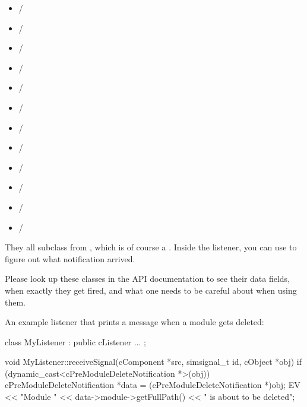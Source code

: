 \begin{itemize}
  \item {} / 
  \item {} / 
  \item {} / 
  \item {} / 
  \item {} / 
  \item {} / 
  \item {} / 
  \item {} / 
  \item {} / 
  \item {} / 
  \item {} / 
  \item {} / 
\end{itemize}

They all subclass from , which is of course a
. Inside the listener, you can use  to figure
out what notification arrived.

\begin{note}
  Please look up these classes in the API documentation to see their data fields,
  when exactly they get fired, and what one needs to be careful about when using them.
\end{note}

An example listener that prints a message when a module gets deleted:

\begin{cpp}
class MyListener : public cListener
{
   ...
};

void MyListener::receiveSignal(cComponent *src, simsignal_t id, cObject *obj)
{
    if (dynamic_cast<cPreModuleDeleteNotification *>(obj))
    {
        cPreModuleDeleteNotification *data = (cPreModuleDeleteNotification *)obj;
        EV << "Module " << data->module->getFullPath() << " is about to be deleted\n";
    }
}
\end{cpp}


